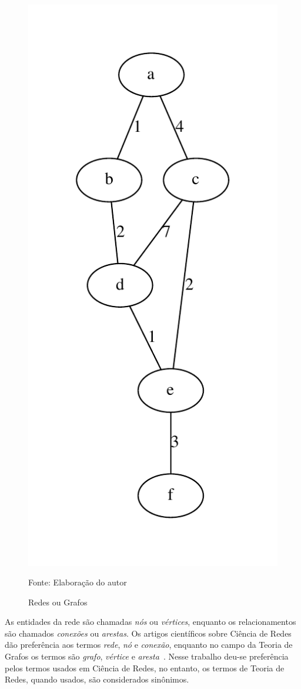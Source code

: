 \documentclass[12pt,a4paper]{article}
\newcommand{\source}[1]{\vspace{-10pt} \caption*{Fonte: {#1}} }
\begin{document}
\begin{figure}[ht]
{        \includegraphics[scale=0.44]{weighted.pdf}
        \label{fig:exemplo-grafo-ponderado}
    }    
    \caption{Redes ou Grafos}
    \label{fig:exemplo-tipos-grafo}
    \source{Elaboração do autor}
\end{figure}

As entidades da rede são chamadas \textit{nós} ou \textit{vértices}, enquanto os relacionamentos são chamados \textit{conexões} ou \textit{arestas}. Os artigos científicos sobre Ciência de Redes dão preferência aos termos \textit{rede}, \textit{nó} e \textit{conexão}, enquanto no campo da Teoria de Grafos os termos são \textit{grafo}, \textit{vértice} e \textit{aresta}~\cite[p.~45]{Barabasi2016-rn}. Nesse trabalho deu-se preferência pelos termos usados em Ciência de Redes, no entanto, os termos de Teoria de Redes, quando usados, são considerados sinônimos.
\end{document}
